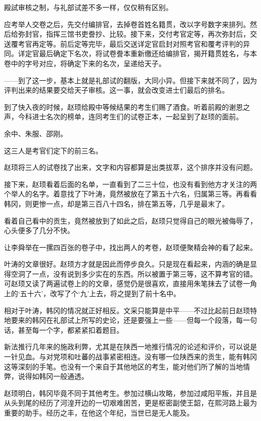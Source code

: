 殿試审核之制，与礼部试差不多一样，仅仅稍有区别。

应考举人交卷之后，先交付编排官，去掉卷首姓名籍贯，改以字号数字来排列。然后给弥封官，指挥三馆书吏誊抄、比较。接下来，交付考官定等，再次弥封后，交送覆考官再定等。前后定等完毕，最后交送详定官启封对照考官和覆考评判的异同。详定官最后确定下名次，将试卷誊本重新缴还给编排官，揭开籍贯姓名，与本卷中的字号对应，将确定下来的名次，呈递给天子。

——到了这一步，基本上就是礼部试的翻版，大同小异。但接下来就不同了，因为评判出来的结果要交给天子审核。这一事，就会改变进士们最后的排名。

到了快入夜的时候，赵顼给殿中等候结果的考生们赐了酒食。听着前殿的谢恩之声，今科进士名次的榜单，连同考生们的试卷正本，一起呈到了赵顼的面前。

余中、朱服、邵刚。

这三人是考官们定下的前三名。

赵顼将三人的试卷找了出来，文字和内容都算是出类拔萃，这个排序并没有问题。

接下来，赵顼看着后面的名单，一直看到了二三十位，也没有看到他方才关注的两个举人的名字。着意找了下叶涛，竟然被放在了第五十六名，归属第三等。再看看韩冈，则更惨一点，却是第三百八十四名，排在第五等，几乎是最末了。

看着自己看中的贡生，竟然被放到了如此之后，赵顼只觉得自己的眼光被侮辱了，心头便多了几分不快。

让李舜举在一摞四百张的卷子中，找出两人的考卷，赵顼便聚精会神的看了起来。

叶涛的文章很好。赵顼方才就是因此而停步良久。只是现在看起来，内涵的确是显得空洞了一点，没有说到多少实在的东西。所以被置于第三等，这不算考官的错。可赵顼又读了两遍试卷上的的文章，感觉仍是很喜欢，直接用朱笔抹去了试卷一角上的‘五十六’，改写了个‘九’上去，将之提到了前十名中。

相对于叶涛，韩冈的情况就正好相反。文采只能算是中平——不过比起前日赵顼特地要来的韩冈在礼部试上所写的史论，还是要强上一些——但每一个段落，每一句话，甚至每一个字，都紧紧扣着题目。

新法推行几年来的施政利弊，尤其是在陕西一地推行情况的论述和评价，可以说是一针见血。与对党项和吐蕃的战事紧密相连。没有哪一位陕西来的贡生，能有韩冈这等深刻的手笔。也没有一个来自于其他地区的考生，能对他们所了解的当地情弊，说得如韩冈一般通透。

赵顼明白，韩冈毕竟不同于其他考生。参加过横山攻略，参加过咸阳平叛，并且是从头到尾的经历了河湟开边的一切艰难困苦，更是枢密副使王韶，在熙河路上最为重要的助手。经历之丰，在他这个年纪，当世已是无人能及。

